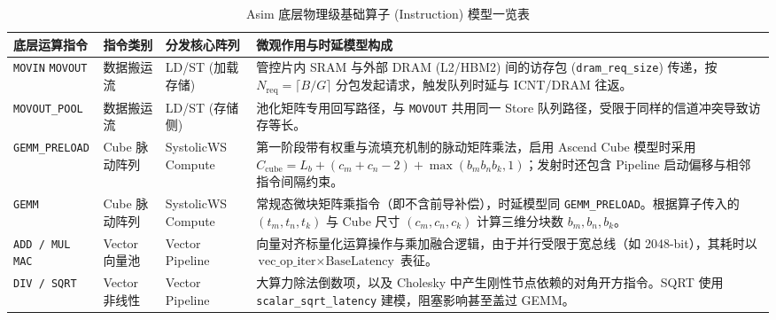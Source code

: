 \documentclass{CjC}
\begin{document}
    \begin{table}[H]
        \centering
        \caption{Asim 底层物理级基础算子 (Instruction) 模型一览表}
        \begin{tabular}{p{2.6cm} p{2.0cm} p{3.2cm} p{6.2cm}}
            \toprule \textbf{底层运算指令}                              & \textbf{指令类别} & \textbf{分发核心阵列}           & \textbf{微观作用与时延模型构成}                                                                                                                             \\
            \midrule \texttt{MOVIN} \newline \texttt{MOVOUT}      & 数据搬运流         & LD/ST (加载存储)              & 管控片内 SRAM 与外部 DRAM (L2/HBM2) 间的访存包 (\texttt{dram\_req\_size}) 传递，按 $N_{\text{req}}=\lceil B/G\rceil$ 分包发起请求，触发队列时延与 ICNT/DRAM 往返。                \\
            \midrule \texttt{MOVOUT\_POOL}                        & 数据搬运流         & LD/ST (存储侧)               & 池化矩阵专用回写路径，与 \texttt{MOVOUT} 共用同一 Store 队列路径，受限于同样的信道冲突导致访存等长。                                                                                   \\
            \midrule \texttt{GEMM\_PRELOAD}                       & Cube 脉动阵列     & SystolicWS Compute        & 第一阶段带有权重与流填充机制的脉动矩阵乘法，启用 Ascend Cube 模型时采用 $C_{\text{cube}}= L_{b}+(c_{m}+c_{n}-2)+\max(b_{m}b_{n}b_{k},1)$；发射时还包含 Pipeline 启动偏移与相邻指令间隔约束。       \\
            \midrule \texttt{GEMM}                                & Cube 脉动阵列     & SystolicWS Compute        & 常规态微块矩阵乘指令（即不含前导补偿），时延模型同 \texttt{GEMM\_PRELOAD}。根据算子传入的 $(t_{m},t_{n},t_{k})$ 与 Cube 尺寸 $(c_{m},c_{n},c_{k})$ 计算三维分块数 $b_{m},b_{n},b_{k}$。      \\
            \midrule \texttt{ADD / MUL} \newline \texttt{MAC}     & Vector 向量池    & Vector Pipeline           & 向量对齐标量化运算操作与乘加融合逻辑，由于并行受限于宽总线（如 2048-bit），其耗时以 $\text{vec\_op\_iter}\times \text{BaseLatency}$ 表征。                                               \\
            \midrule \texttt{DIV / SQRT}                          & Vector 非线性    & Vector Pipeline           & 大算力除法倒数项，以及 Cholesky 中产生刚性节点依赖的对角开方指令。SQRT 使用 \texttt{scalar\_sqrt\_latency} 建模，阻塞影响甚至盖过 GEMM。                                                   \\

\end{tabular}
\end{table}
\end{document}
